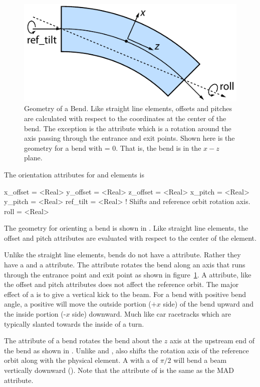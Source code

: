 \begin{figure}[ht]
  \centering
  \includegraphics{roll.pdf}
  \caption[Geometry of a Bend]{
Geometry of a Bend. Like straight line elements, offsets and pitches
are calculated with respect to the coordinates at the center of the
bend. The exception is the  attribute which is a rotation
around the axis passing through the entrance and exit points.  Shown
here is the geometry for a bend with  = 0. That is, the bend
is in the $x-z$ plane.}
  \label{f:roll}
\end{figure}

The orientation attributes for  and  elements is
\begin{example}
  x_offset = <Real>
  y_offset = <Real>
  z_offset = <Real>
  x_pitch  = <Real>
  y_pitch  = <Real>
  ref_tilt = <Real>    ! Shifts and reference orbit rotation axis.
  roll     = <Real>    
\end{example}
The geometry for orienting a bend is shown in . Like
straight line elements, the offset and pitch attributes are evaluated
with respect to the center of the element. 

Unlike the straight line elements, bends do not have a 
attribute. Rather they have a  and a  attribute.
The  attribute rotates the bend along an axis that runs
through the entrance point and exit point as shown in
figure~\ref{f:roll}. A  attribute, like the offset and pitch
attributes does not affect the reference orbit.
The major effect of a  is to give a vertical
kick to the beam. For a bend with positive bend angle, a positive
 will move the outside portion ($+x$ side) of the bend upward
and the inside portion (-$x$ side) downward. Much like car racetracks
which are typically slanted towards the inside of a turn.

The  attribute of a bend rotates the bend about the $z$
axis at the upstream end of the bend as shown in . Unlike
 and ,  also shifts the rotation axis
of the reference orbit along with the physical element. A 
with a  of $\pi/2$ will bend a beam vertically downward
(). Note that the  attribute of \bmad is
the same as the MAD  attribute.

